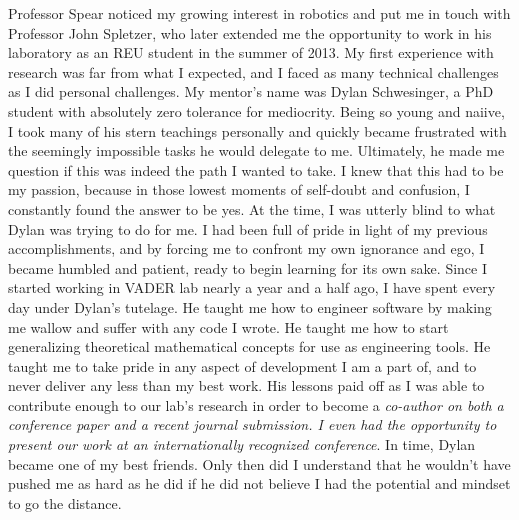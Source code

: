 \documentclass[12pt]{article}
\begin{document}
Professor Spear noticed my growing interest in robotics and put me in touch
with Professor John Spletzer, who later extended me the opportunity to work in
his laboratory as an REU student in the summer of 2013. My first experience
with research was far from what I expected, and I faced as many technical
challenges as I did personal challenges.  My mentor's name was Dylan
Schwesinger, a PhD student with absolutely zero tolerance for mediocrity.
Being so young and naiive, I took many of his stern teachings personally and
quickly became frustrated with the seemingly impossible tasks he would delegate
to me. Ultimately, he made me question if this was indeed the path I wanted to
take.  I knew that this had to be my passion, because in those lowest moments
of self-doubt and confusion, I constantly found the answer to be yes. At the
time, I was utterly blind to what Dylan was trying to do for me. I had been
full of pride in light of my previous accomplishments, and by forcing me to
confront my own ignorance and ego, I became humbled and patient, ready to begin
learning for its own sake. Since I started working in VADER lab nearly a year
and a half ago, I have spent every day under Dylan's tutelage.  He taught me
how to engineer software by making me wallow and suffer with any code I wrote.
He taught me how to start generalizing theoretical mathematical concepts for
use as engineering tools. He taught me to take pride in any aspect of
development I am a part of, and to never deliver any less than my best work.
His lessons paid off as I was able to contribute enough to our lab's research
in order to become a \emph{co-author on both a conference paper and a recent
journal submission. I even had the opportunity to present our work at an
internationally recognized conference}. In time, Dylan became one of my best
friends. Only then did I understand that he wouldn't have pushed me as hard as
he did if he did not believe I had the potential and mindset to go the
distance.
\end{document}
